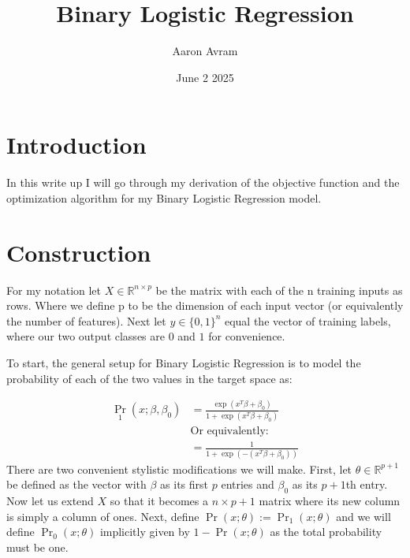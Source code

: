 \documentclass[12pt]{article}
\title{Binary Logistic Regression}
\author{Aaron Avram}
\date{June 2 2025}
\begin{document}
\maketitle

\section*{Introduction}
In this write up I will go through my derivation of the objective function and the optimization algorithm for my Binary
Logistic Regression model.

\section*{Construction}
For my notation let $X \in \mathbb{R}^{n \times p}$ be the matrix
with each of the n training inputs as rows. Where we define p to be the dimension
of each input vector (or equivalently the number of features). Next
let $y \in \{0, 1\}^n$ equal the vector of training labels, where our two
output classes are $0$ and $1$ for convenience.


To start, the general setup for Binary Logistic Regression is to model the probability of each of the two values in the target space as:

\begin{align*}
    \Pr_1(x; \beta, \beta_0) &= \frac{\exp(x^T\beta + \beta_0)}{1 +\exp(x^T\beta + \beta_0)} \\
    &\text{Or equivalently:} \\
    &= \frac{1}{1 + \exp(-(x^T\beta + \beta_0))}
\end{align*}
There are two convenient stylistic modifications we will make. 
First, let $\theta \in \mathbb{R}^{p+1}$ be defined as the vector with
$\beta$ as its first $p$ entries and $\beta_0$ as its $p + 1$th entry.
Now let us extend $X$ so that it becomes a $n \times p + 1$ matrix where
its new column is simply a column of ones. Next, define $\Pr(x; \theta) := \Pr_1(x; \theta)$
and we will define $\Pr_0(x; \theta)$ implicitly given by $1 - \Pr(x; \theta)$
as the total probability must be one.
\end{document}
